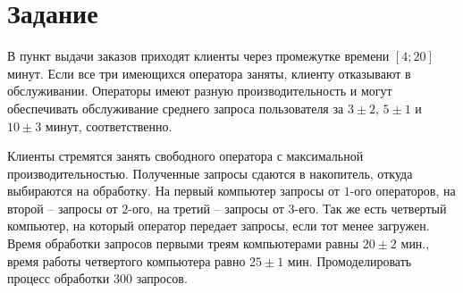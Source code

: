 \chapter{Задание}

В пункт выдачи заказов приходят клиенты через промежутке времени $[4; 20]$ минут. Если все три имеющихся оператора заняты, клиенту отказывают в обслуживании. Операторы имеют разную производительность и могут обеспечивать обслуживание среднего запроса пользователя за $3 \pm 2$, $5 \pm 1$ и
$10 \pm 3$ минут, соответственно. 

Клиенты стремятся занять свободного оператора с максимальной производительностью. Полученные запросы сдаются в накопитель, откуда выбираются на обработку. На первый компьютер запросы от $1$-ого операторов, на второй -- запросы от $2$-ого, на третий -- запросы от $3$-его. Так же есть четвертый компьютер, на который оператор передает запросы, если тот менее загружен. Время обработки запросов первыми треям компьютерами равны $20 \pm 2$ мин., время работы четвертого компьютера равно $25 \pm 1$ мин. Промоделировать процесс обработки $300$ запросов.